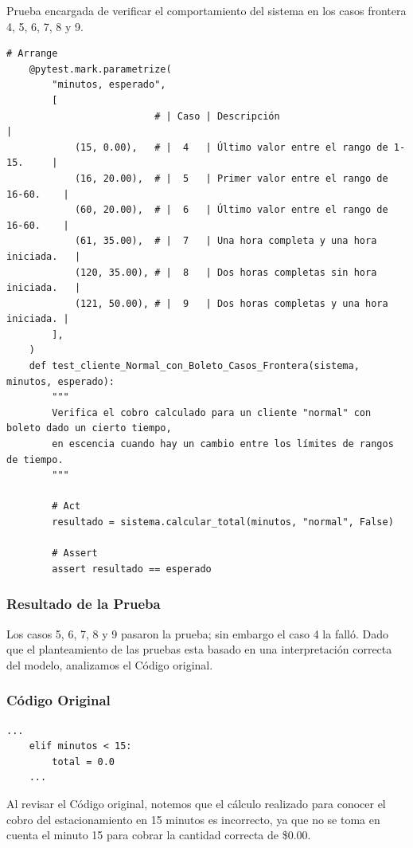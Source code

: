 \documentclass[11pt,letterpaper]{article}
\begin{document}
Prueba encargada de verificar el comportamiento del sistema en los casos frontera 4, 5, 6, 7, 8 y 9.

\vspace{\baselineskip}


\begin{lstlisting}[style=practica]
    # Arrange
    @pytest.mark.parametrize(
        "minutos, esperado",
        [
                          # | Caso | Descripción                              |
            (15, 0.00),   # |  4   | Último valor entre el rango de 1-15.     |
            (16, 20.00),  # |  5   | Primer valor entre el rango de 16-60.    |
            (60, 20.00),  # |  6   | Último valor entre el rango de 16-60.    |
            (61, 35.00),  # |  7   | Una hora completa y una hora iniciada.   |
            (120, 35.00), # |  8   | Dos horas completas sin hora iniciada.   |
            (121, 50.00), # |  9   | Dos horas completas y una hora iniciada. |
        ],
    )
    def test_cliente_Normal_con_Boleto_Casos_Frontera(sistema, minutos, esperado):
        """
        Verifica el cobro calculado para un cliente "normal" con boleto dado un cierto tiempo,
        en escencia cuando hay un cambio entre los límites de rangos de tiempo.
        """
    
        # Act
        resultado = sistema.calcular_total(minutos, "normal", False)
    
        # Assert
        assert resultado == esperado
\end{lstlisting}
\subsubsection{Resultado de la Prueba}
\label{sec:org966062e}

Los casos 5, 6, 7, 8 y 9 pasaron la prueba; sin embargo el caso 4 la falló. Dado que el planteamiento de las pruebas esta basado en una interpretación correcta del modelo, analizamos el Código original.
\subsubsection{Código Original}
\label{sec:orgf9357bc}


\begin{lstlisting}[style=practica]
    ...
    elif minutos < 15:
        total = 0.0
    ...
\end{lstlisting}

Al revisar el Código original, notemos que el cálculo realizado para conocer el cobro del estacionamiento en 15 minutos es incorrecto, ya que no se toma en cuenta el minuto 15 para cobrar la cantidad correcta de \$0.00.
\end{document}
